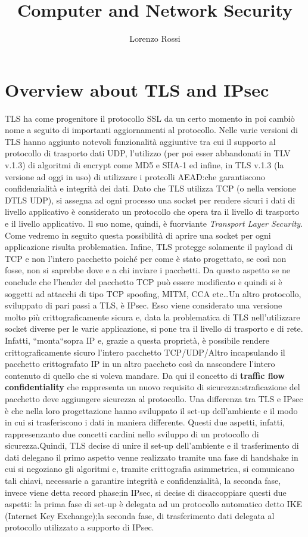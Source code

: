 \documentclass{article}
\title{Computer and Network Security}
\author{Lorenzo Rossi}
\begin{document}
\section{Overview about TLS and IPsec}
TLS ha come progenitore il protocollo SSL da un certo momento in poi cambiò nome a seguito di importanti aggiornamenti al protocollo.
Nelle varie versioni di TLS hanno aggiunto notevoli funzionalità aggiuntive tra cui il supporto al protocollo di trasporto dati UDP, l'utilizzo (per poi esser abbandonati in TLV v.1.3) di algoritmi di encrypt come MD5 e SHA-1 ed infine, in TLS v.1.3 (la versione ad oggi in uso) di utilizzare i protcolli AEAD:\@protocolli che garantiscono confidenzialità e integrità dei dati.
Dato che TLS utilizza TCP (o nella versione DTLS UDP), si assegna ad ogni processo una socket per rendere sicuri i dati di livello applicativo è considerato un protocollo che opera tra il livello di trasporto e il livello applicativo.
Il suo nome, quindi, è fuorviante \emph{Transport Layer Security}. Come vedremo in seguito questa possibilità di aprire una socket per ogni applicazione risulta problematica.
Infine, TLS protegge solamente il payload di TCP e non l'intero pacchetto poiché per come è stato progettato, se così non fosse, non si saprebbe dove e a chi inviare i pacchetti. Da questo aspetto se ne conclude che l'header del pacchetto TCP può essere modificato e quindi si è soggetti ad attacchi di tipo TCP spoofing, MITM, CCA etc\dots\newline Un altro protocollo, sviluppato di pari passi a TLS, è IPsec.
Esso viene considerato una versione molto più crittograficamente sicura e, data la problematica di TLS nell'utilizzare socket diverse per le varie applicazione, si pone tra il livello di trasporto e di rete.
Infatti, ``monta``sopra IP e, grazie a questa proprietà, è possibile rendere crittograficamente sicuro l'intero pacchetto TCP/UDP/Altro incapsulando il pacchetto crittografato IP in un altro paccheto così da nascondere l'intero contenuto di quello che si voleva mandare.\newline
Da qui il concetto di \textbf{traffic flow confidentiality} che rappresenta un nuovo requisito di sicurezza:\@la straficazione del pacchetto deve aggiungere sicurezza al protocollo.\newline
Una differenza tra TLS e IPsec è che nella loro progettazione hanno sviluppato il set-up dell'ambiente e il modo in cui si trasferiscono i dati in maniera differente. Questi due aspetti, infatti, rappresenzanto due concetti cardini nello sviluppo di un protocollo di sicurezza.\newline Quindi, TLS decise di unire il set-up dell'ambiente e il trasferimento di dati delegano il primo aspetto venne realizzato tramite una fase di handshake in cui si negoziano gli algoritmi e, tramite crittografia asimmetrica, si comunicano tali chiavi, necessarie a garantire integrità e confidenzialità, la seconda fase, invece viene detta record phase;\@mentre in IPsec, si decise di disaccoppiare questi due aspetti: la prima fase di set-up è delegata ad un protocollo automatico detto IKE (Internet Key Exchange);la seconda fase, di trasferimento dati delegata al protocollo utilizzato a supporto di IPsec.
\newpage
\end{document}
